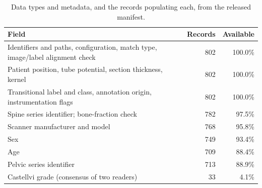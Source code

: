 \begin{table}[htbp]
\caption{\label{tab:completeness}Data types and metadata, and the records populating
each, from the released manifest.}
\begin{ruledtabular}
\begin{tabular}{lrr}
Field & Records & Available \\
\hline
Identifiers and paths, configuration, match type, image/label alignment check & 802 & 100.0\% \\
Patient position, tube potential, section thickness, kernel & 802 & 100.0\% \\
Transitional label and class, annotation origin, instrumentation flags & 802 & 100.0\% \\
Spine series identifier; bone-fraction check & 782 & 97.5\% \\
Scanner manufacturer and model & 768 & 95.8\% \\
Sex & 749 & 93.4\% \\
Age & 709 & 88.4\% \\
Pelvic series identifier & 713 & 88.9\% \\
Castellvi grade (consensus of two readers) & 33 & 4.1\% \\
\end{tabular}
\end{ruledtabular}
\end{table}


